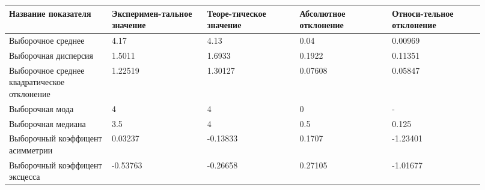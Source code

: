 \begin{center}
\begin{tabular}{|p{0.2\linewidth}|p{0.18\linewidth}|p{0.18\linewidth}|p{0.18\linewidth}|p{0.18\linewidth}|}\hline
Название показателя & Эксперимен{-}тальное значение & Теоре{-}тическое значение & Абсолютное отклонение & Относи{-}тельное отклонение\\\hline
Выборочное среднее & 4.17 & 4.13 & 0.04 & 0.00969 \\\hline
Выборочная дисперсия & 1.5011 & 1.6933 & 0.1922 & 0.11351 \\\hline
Выборочное среднее\newline
квадратическое отклонение & 1.22519 & 1.30127 & 0.07608 & 0.05847 \\\hline
Выборочная мода & 4 & 4 & 0 & - \\\hline
Выборочная медиана & 3.5 & 4 & 0.5 & 0.125 \\\hline
Выборочный коэффицент асимметрии & 0.03237 & -0.13833 & 0.1707 & -1.23401 \\\hline
Выборочный коэффицент эксцесса & -0.53763 & -0.26658 & 0.27105 & -1.01677 \\\hline
\end{tabular}
\end{center}
